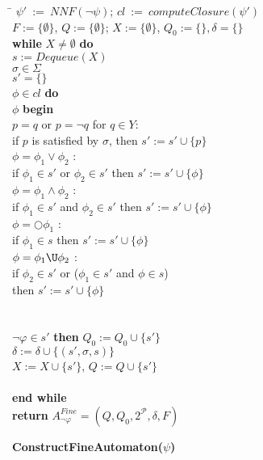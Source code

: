 \begin{algorithm}[t]
\begin{algorithmic}
\begin{tabbing}
\= $\psi'\ :=\ NNF(\neg\psi)$; $cl\ :=\ computeClosure(\psi')$\\
\> $F := \{\emptyset\}$, $Q := \{\emptyset\}$; $X := \{\emptyset\}$, $Q_0 := \{\}, \delta = \{\}$\\ 
\> {\bf while} $X \neq \emptyset$ {\bf do}\\
\> \quad $s := Dequeue(X)$\\
\>  $\sigma \in \Sigma$\\
\> \quad \quad $s' = \{\}$\\
\> \quad {} $\phi \in cl$ {\bf do}\\
\> \quad \quad {} $\phi$ {\bf begin}\\
\> \quad \quad \quad {} $p = q$ or $p = \lnot q$ for $q \in Y$:\\
\> \quad \quad \quad \quad if $p$ is satisfied by $\sigma$, then $s' := s' \cup \{p\}$\\
\> \quad \quad \quad {} $\phi = \phi_1 \lor \phi_2$ :\\
\> \quad \quad \quad \quad if $\phi_1 \in s'$ or $\phi_2 \in s'$ then $s' := s' \cup \{\phi\}$\\
\> \quad \quad \quad {} $\phi = \phi_1 \land \phi_2$ :\\
\> \quad \quad \quad \quad if $\phi_1 \in s'$ and $\phi_2 \in s'$ then $s' := s' \cup \{\phi\}$\\
\> \quad \quad \quad {} $\phi = \bigcirc \phi_1$ :\\
\> \quad \quad \quad \quad if $\phi_1 \in s$ then $s' := s' \cup \{\phi\}$\\
\> \quad \quad \quad {} $\phi = \phi_1 \U \phi_2$ :\\
\> \quad \quad \quad \quad if $\phi_2 \in s'$ or ($\phi_1 \in s'$ and $\phi \in s$)\\
\> \quad \quad \quad \quad then $s' := s' \cup \{\phi\}$\\
\> \quad \quad {}\\
\> \quad {}\\
\> \quad {} $\lnot\varphi \in s'$ {\bf then} $Q_0 := Q_0 \cup \{s'\}$\\
\> \quad \quad $\delta := \delta \cup \{(s', \sigma, s)\}$\\
\> \quad \quad $X := X \cup \{s'\}$, $Q := Q \cup \{s'\}$\\
\> \\
\> {\bf end while}\\
\> {\bf return} $A^{Fine}_{\lnot \varphi} = (Q,Q_0,2^{\mathcal{P}},\delta,F)$
\end{tabbing}
\end{algorithmic}
\caption{
{\bf ConstructFineAutomaton($\psi$)}\label{algo:fine}}
\end{algorithm}


